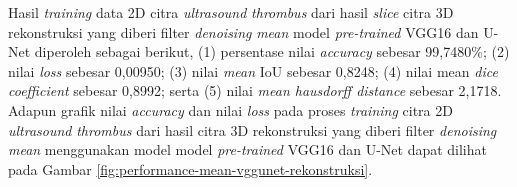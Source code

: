 \begin{enumerate}
	
	Hasil \textit{training} data 2D citra \textit{ultrasound} \textit{thrombus} dari hasil \textit{slice} citra 3D rekonstruksi yang diberi filter \textit{denoising} \textit{mean} model \textit{pre-trained} VGG16 dan U-Net diperoleh sebagai berikut, (1) persentase nilai \textit{accuracy} sebesar 99,7480\%; (2) nilai \textit{loss} sebesar 0,00950; (3) nilai \textit{mean} IoU sebesar 0,8248; (4) nilai mean \textit{dice coefficient} sebesar 0,8992; serta (5) nilai \textit{mean hausdorff distance} sebesar 2,1718. Adapun grafik nilai \textit{accuracy} dan nilai \textit{loss} pada proses \textit{training} citra 2D \textit{ultrasound} \textit{thrombus} dari hasil citra 3D rekonstruksi yang diberi filter \textit{denoising} \textit{mean} menggunakan model model \textit{pre-trained} VGG16 dan U-Net dapat dilihat pada Gambar \ref{fig:performance-mean-vggunet-rekonstruksi}.
	

\end{enumerate}
